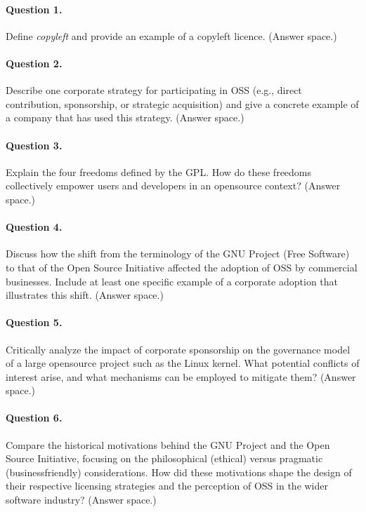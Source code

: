 \documentclass[12pt, a4paper]{article}
\begin{document}
\newpage
\paragraph{Question 1.}
Define \emph{copyleft} and provide an example of a copyleft licence.  
(Answer space.)

\newpage
\paragraph{Question 2.}
Describe one corporate strategy for participating in OSS (e.g., direct contribution, sponsorship, or strategic acquisition) and give a concrete example of a company that has used this strategy.  
(Answer space.)

\newpage
\paragraph{Question 3.}
Explain the four freedoms defined by the GPL.  How do these freedoms collectively empower users and developers in an opensource context?  
(Answer space.)

\newpage
\paragraph{Question 4.}
Discuss how the shift from the terminology of the GNU Project (Free Software) to that of the Open Source Initiative affected the adoption of OSS by commercial businesses.  Include at least one specific example of a corporate adoption that illustrates this shift.  
(Answer space.)

\newpage
\paragraph{Question 5.}
Critically analyze the impact of corporate sponsorship on the governance model of a large opensource project such as the Linux kernel.  What potential conflicts of interest arise, and what mechanisms can be employed to mitigate them?  
(Answer space.)

\newpage
\paragraph{Question 6.}
Compare the historical motivations behind the GNU Project and the Open Source Initiative, focusing on the philosophical (ethical) versus pragmatic (businessfriendly) considerations.  How did these motivations shape the design of their respective licensing strategies and the perception of OSS in the wider software industry?  
(Answer space.)
\end{document}
